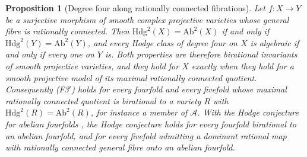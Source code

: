 \documentclass[11pt,reqno]{amsart}
\theoremstyle{plain}
\newtheorem{proposition}[theorem]{Proposition}
\theoremstyle{definition}
\theoremstyle{remark}
\newcommand{\Hdg}{\mathrm{Hdg}}
\begin{document}
\begin{proposition}[Degree four along rationally connected fibrations]
\label{prop:f3primefibration}
Let $f\colon X\to Y$ be a surjective morphism of smooth complex projective
varieties whose general fibre is rationally connected. Then
$\Hdg^{2}(X)=\mathrm{Ab}^{2}(X)$ if and only if
$\Hdg^{2}(Y)=\mathrm{Ab}^{2}(Y)$, and every Hodge class of degree four on $X$
is algebraic if and only if every one on $Y$ is. Both properties are
therefore birational invariants of smooth projective varieties, and they hold
for $X$ exactly when they hold for a smooth projective model of its maximal
rationally connected quotient. Consequently \textup{(F3$'$)} holds for every
fourfold and every fivefold whose maximal rationally connected quotient is
birational to a variety $R$ with $\Hdg^{2}(R)=\mathrm{Ab}^{2}(R)$, for
instance a member of $\mathcal{A}$. With the Hodge conjecture for abelian
fourfolds \cite{Mar25a,Mar25b}, the Hodge conjecture holds for every fourfold
birational to an abelian fourfold, and for every fivefold admitting a
dominant rational map with rationally connected general fibre onto an
abelian fourfold.
\end{proposition}
\end{document}
